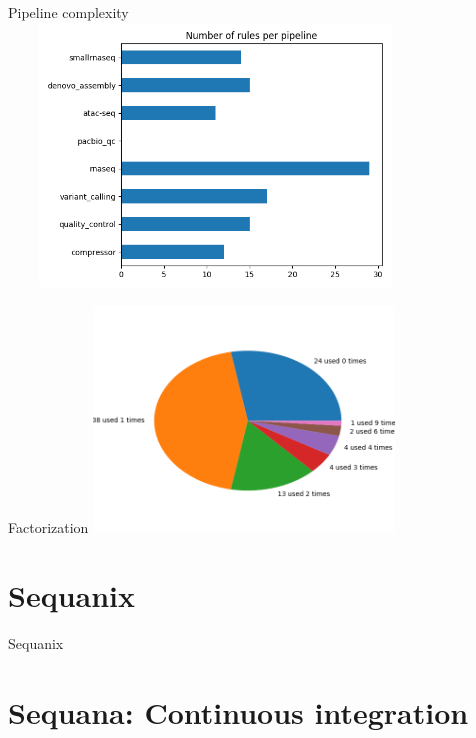 \documentclass{beamer}
\begin{document}
\begin{frame}{Pipeline complexity}
    \includegraphics[width=11cm, height=7cm]{images/number_of_rules.png}
\end{frame}


\begin{frame}{Factorization}
\centering
    \includegraphics[width=8cm]{images/rules_reusing.png}
\end{frame}




\section{Sequanix}

\begin{frame}[plain]
 \centering
 \begin{Huge}
 Sequanix
 \end{Huge}
\end{frame}




\section{Sequana: Continuous integration}

\end{document}
